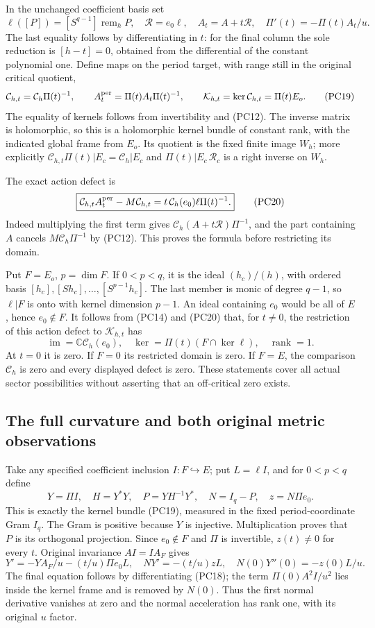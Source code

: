 In the unchanged coefficient basis set
\[
 \ell([P])=[S^{q-1}]\operatorname{rem}_hP,\quad
 \mathcal R=e_0\ell,\quad A_t=A+t\mathcal R,\quad
 \Pi'(t)=-\Pi(t)A_t/u.
 \tag{PC18}
\]
The last equality follows by differentiating in $t$: for the final
column the sole reduction is $[h-t]=0$, obtained from the
differential of the constant polynomial one.
Define maps on the period target, with range still in the original
critical quotient,
\[
 \mathcal C_{h,t}=\mathcal C_h\Pi(t)^{-1},\qquad
 A_t^{\rm per}=\Pi(t)A_t\Pi(t)^{-1},\qquad
 \mathcal K_{h,t}=\ker\mathcal C_{h,t}=\Pi(t)E_o.
 \tag{PC19}
\]
The equality of kernels follows from invertibility and (PC12).
The inverse matrix is holomorphic, so this is a holomorphic kernel
bundle of constant rank, with the indicated global frame from $E_o$.
Its quotient is the fixed finite image $W_h$; more explicitly
$\mathcal C_{h,t}\Pi(t)|E_c=\mathcal C_h|E_c$ and
$\Pi(t)|E_c\,\mathcal R_c$ is a right inverse on $W_h$.

The exact action defect is
\[
 \boxed{\mathcal C_{h,t}A_t^{\rm per}-M\mathcal C_{h,t}
       =t\,\mathcal C_h(e_0)\ell\Pi(t)^{-1}.}
 \tag{PC20}
\]
Indeed multiplying the first term gives
$\mathcal C_h(A+t\mathcal R)\Pi^{-1}$, and the part containing
$A$ cancels $M\mathcal C_h\Pi^{-1}$ by (PC12).  This proves
the formula before restricting its domain.

Put $F=E_o$, $p=\dim F$.  If $0<p<q$, it is the ideal
$(h_c)/(h)$, with ordered basis
$[h_c],[Sh_c],\ldots,[S^{p-1}h_c]$.
The last member is monic of degree $q-1$, so
$\ell|F$ is onto with kernel dimension $p-1$.
An ideal containing $e_0$ would be all of $E$, hence $e_0\notin F$.
It follows from (PC14) and (PC20) that, for $t\ne0$, the
restriction of this action defect to $\mathcal K_{h,t}$ has
\[
 \operatorname{im}=\mathbb C\mathcal C_h(e_0),\quad
 \ker=\Pi(t)(F\cap\ker\ell),\quad\operatorname{rank}=1.
 \tag{PC21}
\]
At $t=0$ it is zero.  If $F=0$ its restricted domain is zero.
If $F=E$, the comparison $\mathcal C_h$ is zero and every
displayed defect is zero.  These statements cover all actual
sector possibilities without asserting that an off-critical zero exists.

\subsection{The full curvature and both original metric observations}

Take any specified coefficient inclusion $I:F\hookrightarrow E$;
put $L=\ell I$, and for $0<p<q$ define
\[
 Y=\Pi I,\quad H=Y^*Y,\quad
 P=YH^{-1}Y^*,\quad N=I_q-P,\quad z=N\Pi e_0.
 \tag{PC22}
\]
This is exactly the kernel bundle (PC19), measured in the fixed
period-coordinate Gram $I_q$.  The Gram is positive because $Y$
is injective.  Multiplication proves that $P$ is its orthogonal
projection.  Since $e_0\notin F$ and $\Pi$ is invertible,
$z(t)\ne0$ for every $t$.  Original invariance $AI=IA_F$ gives
\[
 Y'=-YA_F/u-(t/u)\Pi e_0L,
 \quad NY'=-(t/u)zL,
 \quad N(0)Y''(0)=-z(0)L/u.
 \tag{PC23}
\]
The final equation follows by differentiating (PC18); the term
$\Pi(0)A^2I/u^2$ lies inside the kernel frame and is removed by
$N(0)$.  Thus the first normal derivative vanishes at zero and
the normal acceleration has rank one, with its original $u$ factor.

